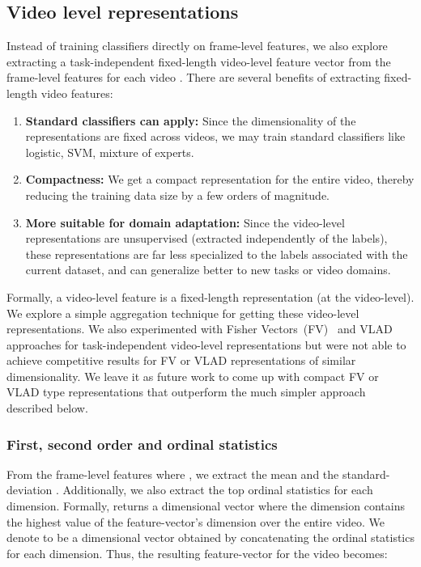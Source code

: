 \documentclass{sig-alternate-05-2015}
\begin{document}
\subsection{Video level representations}
Instead of training classifiers directly on frame-level features, we also
explore extracting a task-independent fixed-length video-level feature vector
from the frame-level features  for each video . There
are several benefits of extracting fixed-length video features:
\begin{enumerate} \setlength\itemsep{0em}
\item \textbf{Standard classifiers can apply:} Since the dimensionality of the representations are fixed across videos, we may train standard classifiers like logistic, SVM, mixture of experts.
\item \textbf{Compactness:} We get a compact representation for the entire video, thereby reducing the training data size by a few orders of magnitude.
\item \textbf{More suitable for domain adaptation:} Since the video-level representations are unsupervised (extracted independently of the labels), these representations are far less specialized to the labels associated with the current dataset,
and can generalize better to new tasks or video domains.
\end{enumerate}
Formally, a video-level feature  is a fixed-length representation (at the video-level). We explore a simple aggregation technique for getting these video-level representations.
We also experimented with Fisher Vectors~(FV)~\cite{fisher1} and VLAD~\cite{vlad}
approaches for task-independent video-level representations but were not able to
achieve competitive results for FV or VLAD representations of similar dimensionality.
We leave it as future work to come up with compact FV or VLAD type representations
that outperform the much simpler approach described below.


\subsubsection{First, second order and ordinal statistics}
\label{sec:simplestats}
From the frame-level features  where ,
we extract the mean  and the standard-deviation
. Additionally, we also extract the top 
ordinal statistics for each dimension. Formally,  returns a  dimensional vector where the  dimension contains the  highest value of the feature-vector's  dimension over the entire video. We denote  to be a  dimensional vector obtained by concatenating the ordinal statistics for each dimension. Thus, the resulting feature-vector   for the video becomes:
\end{document}
